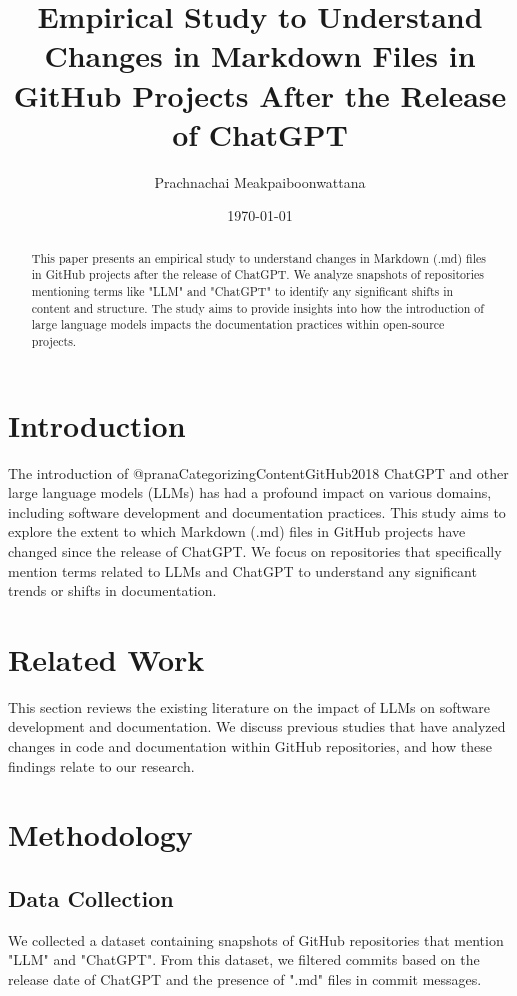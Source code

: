 \documentclass[a4paper, 12pt]{article}
\title{Empirical Study to Understand Changes in Markdown Files in GitHub Projects After the Release of ChatGPT}
\author{Prachnachai Meakpaiboonwattana}
\date{\today}
\begin{document}
\maketitle

\begin{abstract}
This paper presents an empirical study to understand changes in Markdown (.md) files in GitHub projects after the release of ChatGPT. We analyze snapshots of repositories mentioning terms like "LLM" and "ChatGPT" to identify any significant shifts in content and structure. The study aims to provide insights into how the introduction of large language models impacts the documentation practices within open-source projects.
\end{abstract}

\section{Introduction}
The introduction of @pranaCategorizingContentGitHub2018 ChatGPT and other large language models (LLMs) has had a profound impact on various domains, including software development and documentation practices. This study aims to explore the extent to which Markdown (.md) files in GitHub projects have changed since the release of ChatGPT. We focus on repositories that specifically mention terms related to LLMs and ChatGPT to understand any significant trends or shifts in documentation.

\section{Related Work}
\label{sec:relatedwork}
This section reviews the existing literature on the impact of LLMs on software development and documentation. We discuss previous studies that have analyzed changes in code and documentation within GitHub repositories, and how these findings relate to our research.

\section{Methodology}
\label{sec:methodology}
\subsection{Data Collection}
We collected a dataset containing snapshots of GitHub repositories that mention "LLM" and "ChatGPT". From this dataset, we filtered commits based on the release date of ChatGPT and the presence of ".md" files in commit messages.
\end{document}
